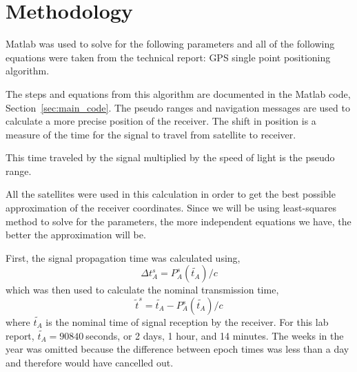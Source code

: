 \section{Methodology} 

\label{sec:methodology}

Matlab was used to solve for the following parameters and all of the following equations were taken from the technical report: GPS single point positioning algorithm.\cite{milanGPS} 

The steps and equations from this algorithm are documented in the Matlab code, Section~\ref{sec:main_code}. The pseudo ranges and navigation messages are used to calculate a more precise position of the receiver. The shift in position is a measure of the time for the signal to travel from satellite to receiver. 

This time traveled by the signal multiplied by the speed of light is the pseudo range. 

All the satellites were used in this calculation in order to get the best possible approximation of the receiver coordinates. Since we will be using least-squares method to solve for the parameters, the more independent equations we have, the better the approximation will be. 

First, the signal propagation time was calculated using, 
\begin{equation*}
	\Delta t_A^s = P_A^s(\tilde{t_A})/c 
\end{equation*}
which was then used to calculate the nominal transmission time, 
\begin{equation*}
	\tilde{t}^s = \tilde{t_A} - P_A^s(\tilde{t_A})/c 
\end{equation*}
where $\tilde{t_A}$ is the nominal time of signal reception by the receiver. For this lab report, $\tilde{t_A}=90840~$seconds, or 2 days, 1 hour, and 14 minutes. The weeks in the year was omitted because the difference between epoch times was less than a day and therefore would have cancelled out.

